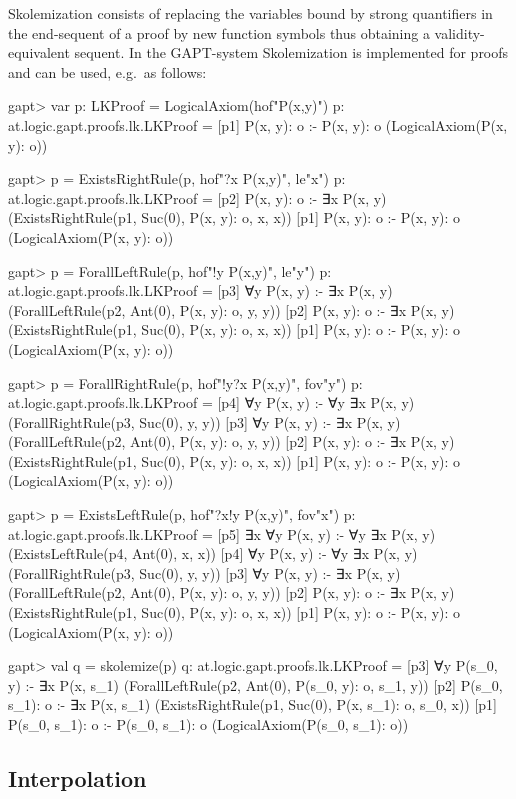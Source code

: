 \documentclass[a4paper,11pt]{article}
\begin{document}
Skolemization consists of replacing the variables bound by strong quantifiers in the end-sequent of a proof
by new function symbols thus obtaining a validity-equivalent sequent. In the GAPT-system Skolemization
is implemented for proofs and can be used, e.g.~as follows:
%
\begin{clilisting}
gapt> var p: LKProof = LogicalAxiom(hof"P(x,y)")
p: at.logic.gapt.proofs.lk.LKProof =
[p1] P(x, y): o :- P(x, y): o    (LogicalAxiom(P(x, y): o))

gapt> p = ExistsRightRule(p, hof"?x P(x,y)", le"x")
p: at.logic.gapt.proofs.lk.LKProof = [p2] P(x, y): o :- ∃x P(x, y)    (ExistsRightRule(p1, Suc(0), P(x, y): o, x, x))
[p1] P(x, y): o :- P(x, y): o    (LogicalAxiom(P(x, y): o))

gapt> p = ForallLeftRule(p, hof"!y P(x,y)", le"y")
p: at.logic.gapt.proofs.lk.LKProof = [p3] ∀y P(x, y) :- ∃x P(x, y)    (ForallLeftRule(p2, Ant(0), P(x, y): o, y, y))
[p2] P(x, y): o :- ∃x P(x, y)    (ExistsRightRule(p1, Suc(0), P(x, y): o, x, x))
[p1] P(x, y): o :- P(x, y): o    (LogicalAxiom(P(x, y): o))

gapt> p = ForallRightRule(p, hof"!y?x P(x,y)", fov"y")
p: at.logic.gapt.proofs.lk.LKProof = [p4] ∀y P(x, y) :- ∀y ∃x P(x, y)    (ForallRightRule(p3, Suc(0), y, y))
[p3] ∀y P(x, y) :- ∃x P(x, y)    (ForallLeftRule(p2, Ant(0), P(x, y): o, y, y))
[p2] P(x, y): o :- ∃x P(x, y)    (ExistsRightRule(p1, Suc(0), P(x, y): o, x, x))
[p1] P(x, y): o :- P(x, y): o    (LogicalAxiom(P(x, y): o))

gapt> p = ExistsLeftRule(p, hof"?x!y P(x,y)", fov"x")
p: at.logic.gapt.proofs.lk.LKProof = [p5] ∃x ∀y P(x, y) :- ∀y ∃x P(x, y)    (ExistsLeftRule(p4, Ant(0), x, x))
[p4] ∀y P(x, y) :- ∀y ∃x P(x, y)    (ForallRightRule(p3, Suc(0), y, y))
[p3] ∀y P(x, y) :- ∃x P(x, y)    (ForallLeftRule(p2, Ant(0), P(x, y): o, y, y))
[p2] P(x, y): o :- ∃x P(x, y)    (ExistsRightRule(p1, Suc(0), P(x, y): o, x, x))
[p1] P(x, y): o :- P(x, y): o    (LogicalAxiom(P(x, y): o))

gapt> val q = skolemize(p)
q: at.logic.gapt.proofs.lk.LKProof =
[p3] ∀y P(s_0, y) :- ∃x P(x, s_1)    (ForallLeftRule(p2, Ant(0), P(s_0, y): o, s_1, y))
[p2] P(s_0, s_1): o :- ∃x P(x, s_1)    (ExistsRightRule(p1, Suc(0), P(x, s_1): o, s_0, x))
[p1] P(s_0, s_1): o :- P(s_0, s_1): o    (LogicalAxiom(P(s_0, s_1): o))

\end{clilisting}


\subsection{Interpolation}
\end{document}
